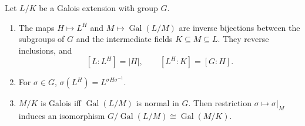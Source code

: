 \begin{theorem}\label{thm:ftgt}
Let $L/K$ be a Galois extension with group $G$.
\begin{enumerate}[label=(\alph*)]
\item The maps $H\mapsto L^H$ and $M\mapsto\operatorname{Gal}(L/M)$ are inverse bijections between the subgroups of $G$ and the intermediate fields $K\subseteq M\subseteq L$. They reverse inclusions, and
\[
[L:L^H]=|H|,\qquad[L^H:K]=[G:H].
\]
\item For $\sigma\in G$, $\sigma(L^H)=L^{\sigma H\sigma^{-1}}$.
\item $M/K$ is Galois iff $\operatorname{Gal}(L/M)$ is normal in $G$. Then restriction $\sigma\mapsto\sigma|_M$ induces an isomorphism $G/\operatorname{Gal}(L/M)\cong\operatorname{Gal}(M/K)$.
\end{enumerate}
\end{theorem}
